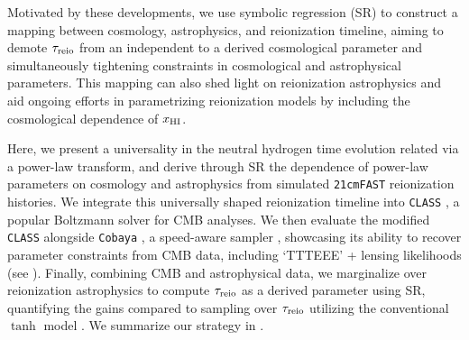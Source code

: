 Motivated by these developments, we use symbolic regression (SR)
\cite{Cranmer2023, Graham2013} to construct a mapping between cosmology,
astrophysics, and reionization timeline, aiming to demote $\tau_{\mathrm{reio}}$
from an independent to a derived cosmological parameter and
simultaneously tightening constraints in cosmological and astrophysical
parameters.
This mapping can also shed light on reionization astrophysics and aid
ongoing efforts in parametrizing reionization models \cite{Trac2018,
Trac2022, Paoletti2024} by including the cosmological dependence of
$x_{\mathrm{HI}}$.

Here, we present a universality in the neutral hydrogen time evolution
related via a power-law transform, and derive through SR the
dependence of power-law parameters on cosmology and astrophysics from
simulated \texttt{21cmFAST} \cite{MesingerEtAl2011, Murray2020}
reionization histories.
We integrate this universally shaped reionization timeline into
\texttt{CLASS} \cite{Blas2011}, a popular Boltzmann solver for CMB
analyses.
We then evaluate the modified \texttt{CLASS} alongside \texttt{Cobaya}
\cite{Torrado2020}, a speed-aware sampler \cite{Lewis2002,
Lewis2013}, showcasing its ability to
recover parameter constraints from CMB data, including `TTTEEE' +
lensing likelihoods \cite{Planck2020c, Planck2020d} (see ).
Finally, combining CMB and astrophysical data, we marginalize over
reionization astrophysics to compute $\tau_{\mathrm{reio}}$ as a derived parameter
using SR, quantifying the gains compared to sampling over $\tau_{\mathrm{reio}}$
utilizing the conventional $\tanh$ model \cite{Lewis2008}.
We summarize our strategy in .

